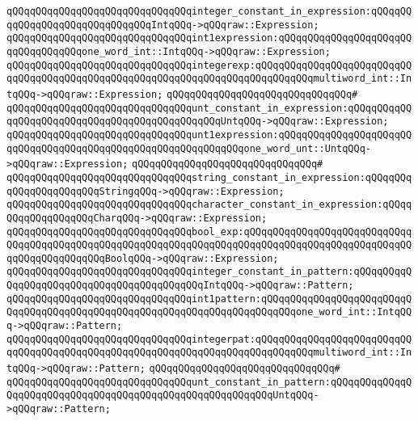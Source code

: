\newline
\verb|qQQqqQQqqQQqqQQqqQQqqQQqqQQqqQQqinteger_constant_in_expression:qQQqqQQqqQQqqQQqqQQqqQQqqQQqqQQqIntqQQq->qQQqraw::Expression;|\newline
\verb|qQQqqQQqqQQqqQQqqQQqqQQqqQQqqQQqint1expression:qQQqqQQqqQQqqQQqqQQqqQQqqQQqqQQqqQQqone_word_int::IntqQQq->qQQqraw::Expression;|\newline
\verb|qQQqqQQqqQQqqQQqqQQqqQQqqQQqqQQqintegerexp:qQQqqQQqqQQqqQQqqQQqqQQqqQQqqQQqqQQqqQQqqQQqqQQqqQQqqQQqqQQqqQQqqQQqqQQqqQQqqQQqmultiword_int::IntqQQq->qQQqraw::Expression;|\newline
\verb|qQQqqQQqqQQqqQQqqQQqqQQqqQQqqQQq#|\newline
\verb|qQQqqQQqqQQqqQQqqQQqqQQqqQQqqQQqunt_constant_in_expression:qQQqqQQqqQQqqQQqqQQqqQQqqQQqqQQqqQQqqQQqqQQqqQQqUntqQQq->qQQqraw::Expression;|\newline
\verb|qQQqqQQqqQQqqQQqqQQqqQQqqQQqqQQqunt1expression:qQQqqQQqqQQqqQQqqQQqqQQqqQQqqQQqqQQqqQQqqQQqqQQqqQQqqQQqqQQqqQQqone_word_unt::UntqQQq->qQQqraw::Expression;|\newline
\verb|qQQqqQQqqQQqqQQqqQQqqQQqqQQqqQQq#|\newline
\verb|qQQqqQQqqQQqqQQqqQQqqQQqqQQqqQQqstring_constant_in_expression:qQQqqQQqqQQqqQQqqQQqqQQqStringqQQq->qQQqraw::Expression;|\newline
\verb|qQQqqQQqqQQqqQQqqQQqqQQqqQQqqQQqcharacter_constant_in_expression:qQQqqQQqqQQqqQQqqQQqCharqQQq->qQQqraw::Expression;|\newline
\verb|qQQqqQQqqQQqqQQqqQQqqQQqqQQqqQQqbool_exp:qQQqqQQqqQQqqQQqqQQqqQQqqQQqqQQqqQQqqQQqqQQqqQQqqQQqqQQqqQQqqQQqqQQqqQQqqQQqqQQqqQQqqQQqqQQqqQQqqQQqqQQqqQQqqQQqqQQqBoolqQQq->qQQqraw::Expression;|\newline
\newline
\verb|qQQqqQQqqQQqqQQqqQQqqQQqqQQqqQQqinteger_constant_in_pattern:qQQqqQQqqQQqqQQqqQQqqQQqqQQqqQQqqQQqqQQqqQQqIntqQQq->qQQqraw::Pattern;|\newline
\verb|qQQqqQQqqQQqqQQqqQQqqQQqqQQqqQQqint1pattern:qQQqqQQqqQQqqQQqqQQqqQQqqQQqqQQqqQQqqQQqqQQqqQQqqQQqqQQqqQQqqQQqqQQqqQQqqQQqone_word_int::IntqQQq->qQQqraw::Pattern;|\newline
\verb|qQQqqQQqqQQqqQQqqQQqqQQqqQQqqQQqintegerpat:qQQqqQQqqQQqqQQqqQQqqQQqqQQqqQQqqQQqqQQqqQQqqQQqqQQqqQQqqQQqqQQqqQQqqQQqqQQqqQQqmultiword_int::IntqQQq->qQQqraw::Pattern;|\newline
\verb|qQQqqQQqqQQqqQQqqQQqqQQqqQQqqQQq#|\newline
\verb|qQQqqQQqqQQqqQQqqQQqqQQqqQQqqQQqunt_constant_in_pattern:qQQqqQQqqQQqqQQqqQQqqQQqqQQqqQQqqQQqqQQqqQQqqQQqqQQqqQQqqQQqUntqQQq->qQQqraw::Pattern;|\newline
